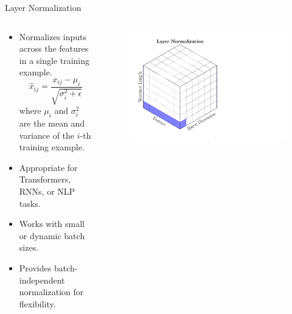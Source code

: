 \begin{frame}{Layer Normalization}
    \begin{columns}
        \begin{column}{0.65\linewidth}
        \begin{itemize}
            \item Normalizes inputs across the features in a single training example.
            \[
            \hat{x}_{ij} = \frac{x_{ij} - \mu_{i}}{\sqrt{\sigma^2_{i} + \epsilon}}
            \]
            where \( \mu_{i} \) and \( \sigma^2_{i} \) are the mean and variance of the \( i \)-th training example.
            \item Appropriate for Transformers, RNNs, or NLP tasks.
            \item Works with small or dynamic batch sizes.
            \item Provides batch-independent normalization for flexibility.
        \end{itemize}
        \end{column} 
        \begin{column}{0.4\linewidth}
        \begin{figure}
            \centering
            \includegraphics[width=1.5\linewidth]{pic/LN_vis.pdf}
            \label{fig:ln}
        \end{figure}
        \end{column}
    \end{columns}
\end{frame}


